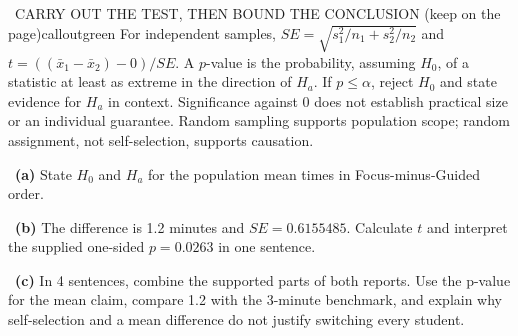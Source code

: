 \documentclass[11pt]{article}
\begin{document}
\begin{callout}{\IconBook\ CARRY OUT THE TEST, THEN BOUND THE CONCLUSION (keep on the page)}{calloutgreen}
For independent samples, $SE=\sqrt{s_1^2/n_1+s_2^2/n_2}$ and
$t=((\bar x_1-\bar x_2)-0)/SE$. A $p$-value is the probability, assuming $H_0$,
of a statistic at least as extreme in the direction of $H_a$. If $p\leq\alpha$, reject
$H_0$ and state evidence for $H_a$ in context. Significance against 0 does not establish
practical size or an individual guarantee. Random sampling supports population scope;
random assignment, not self-selection, supports causation.
\end{callout}

~\textbf{(a)} State $H_0$ and $H_a$ for the population mean times in Focus-minus-Guided order.\par
{}

~\textbf{(b)} The difference is 1.2 minutes and $SE=0.6155485$. Calculate $t$ and interpret the supplied one-sided $p=0.0263$ in one sentence.\par
{}

~\textbf{(c)} In 4 sentences, combine the supported parts of both reports. Use the p-value for the mean claim, compare 1.2 with the 3-minute benchmark, and explain why self-selection and a mean difference do not justify switching every student.\par
{}
\end{document}
